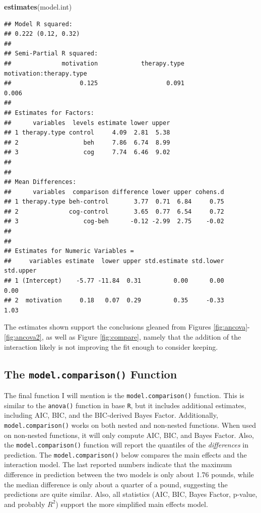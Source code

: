 \documentclass[
  man]{apa6}
\newenvironment{Shaded}{\begin{snugshade}}{\end{snugshade}}
\newcommand{\KeywordTok}[1]{\textcolor[rgb]{0.13,0.29,0.53}{\textbf{#1}}}
\newcommand{\NormalTok}[1]{#1}
\begin{document}
\small

\begin{Shaded}
\begin{Highlighting}[]
\KeywordTok{estimates}\NormalTok{(model.int)}
\end{Highlighting}
\end{Shaded}

\begin{verbatim}
## Model R squared:
## 0.222 (0.12, 0.32)
## 
## Semi-Partial R squared:
##              motivation            therapy.type motivation:therapy.type 
##                   0.125                   0.091                   0.006 
## 
## Estimates for Factors:
##      variables  levels estimate lower upper
## 1 therapy.type control     4.09  2.81  5.38
## 2                  beh     7.86  6.74  8.99
## 3                  cog     7.74  6.46  9.02
## 
## 
## Mean Differences:
##      variables  comparison difference lower upper cohens.d
## 1 therapy.type beh-control       3.77  0.71  6.84     0.75
## 2              cog-control       3.65  0.77  6.54     0.72
## 3                  cog-beh      -0.12 -2.99  2.75    -0.02
## 
## 
## Estimates for Numeric Variables = 
##     variables estimate  lower upper std.estimate std.lower std.upper
## 1 (Intercept)    -5.77 -11.84  0.31         0.00      0.00      0.00
## 2  motivation     0.18   0.07  0.29         0.35     -0.33      1.03
\end{verbatim}

\normalsize
The estimates shown support the conclusions gleaned from Figures \ref{fig:ancova}-\ref{fig:ancova2}, as well as Figure \ref{fig:compare}, namely that the addition of the interaction likely is not improving the fit enough to consider keeping.

\hypertarget{the-model.comparison-function}{%
\subsection{\texorpdfstring{The \texttt{model.comparison()} Function}{The model.comparison() Function}}\label{the-model.comparison-function}}

The final function I will mention is the \texttt{model.comparison()} function. This is similar to the \texttt{anova()} function in base \texttt{R}, but it includes additional estimates, including AIC, BIC, and the BIC-derived Bayes Factor. Additionally, \texttt{model.comparison()} works on both nested and non-nested functions. When used on non-nested functions, it will only compute AIC, BIC, and Bayes Factor. Also, the \texttt{model.comparison()} function will report the quantiles of the \emph{differences} in prediction. The \texttt{model.comparison()} below compares the main effects and the interaction model. The last reported numbers indicate that the maximum difference in prediction between the two models is only about 1.76 pounds, while the median difference is only about a quarter of a pound, suggesting the predictions are quite similar. Also, all statistics (AIC, BIC, Bayes Factor, p-value, and probably \(R^2\)) support the more simplified main effects model.
\end{document}
